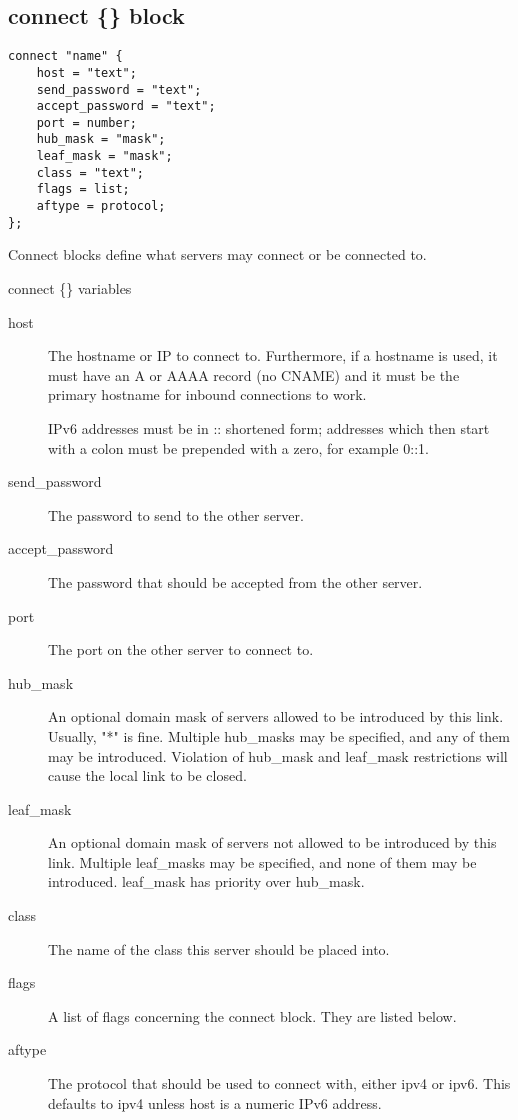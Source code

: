 \subsection{connect \{\} block}

\begin{verbatim}
connect "name" {
	host = "text";
	send_password = "text";
	accept_password = "text";
	port = number;
	hub_mask = "mask";
	leaf_mask = "mask";
	class = "text";
	flags = list;
	aftype = protocol;
};\end{verbatim}

	Connect blocks define what servers may connect or be connected to.

{\sc connect \{\} variables}
\nopagebreak

\noindent
\begin{description}
\item[{host}]
	The hostname or IP to connect to. Furthermore, if a hostname is used,
	it must have an A or AAAA record (no CNAME) and it must be the primary
	hostname for inbound connections to work.

	IPv6 addresses must be in :: shortened form; addresses which then start
	with a colon must be prepended with a zero, for example 0::1.

\item[{send\_password}]
	The password to send to the other server.

\item[{accept\_password}]
	The password that should be accepted from the other server.

\item[{port}]
	The port on the other server to connect to.

\item[{hub\_mask}]
	An optional domain mask of servers allowed to be introduced by this
	link. Usually, "*" is fine. Multiple hub\_masks may be specified, and
	any of them may be introduced. Violation of hub\_mask and leaf\_mask
	restrictions will cause the local link to be closed.

\item[{leaf\_mask}]
	An optional domain mask of servers not allowed to be introduced by this
	link. Multiple leaf\_masks may be specified, and none of them may be
	introduced. leaf\_mask has priority over hub\_mask.

\item[{class}]
	The name of the class this server should be placed into.

\item[{flags}]
	A list of flags concerning the connect block. They are listed below.

\item[{aftype}]
	The protocol that should be used to connect with, either ipv4 or ipv6.
	This defaults to ipv4 unless host is a numeric IPv6 address.
\end{description}


